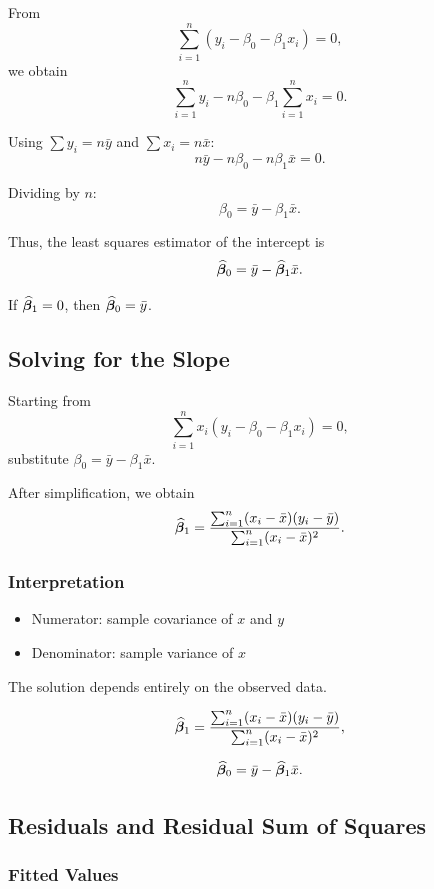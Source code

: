 From
\[
\sum_{i=1}^n (y_i - \beta_0 - \beta_1 x_i) = 0,
\]
we obtain
\[
\sum_{i=1}^n y_i - n\beta_0 - \beta_1 \sum_{i=1}^n x_i = 0.
\]

Using $\sum y_i = n\bar{y}$ and $\sum x_i = n\bar{x}$:
\[
n\bar{y} - n\beta_0 - n\beta_1 \bar{x} = 0.
\]

Dividing by $n$:
\[
\beta_0 = \bar{y} - \beta_1 \bar{x}.
\]

Thus, the least squares estimator of the intercept is
\[
\widehat{\boldsymbol{\beta}}_0 = \bar{y} - \widehat{\boldsymbol{\beta}}_1 \bar{x}.
\]

If $\widehat{\boldsymbol{\beta}}_1 = 0$, then $\widehat{\boldsymbol{\beta}}_0 = \bar{y}$.

\subsection{Solving for the Slope}

Starting from
\[
\sum_{i=1}^n x_i (y_i - \beta_0 - \beta_1 x_i) = 0,
\]
substitute $\beta_0 = \bar{y} - \beta_1 \bar{x}$.

After simplification, we obtain
\[
\widehat{\boldsymbol{\beta}}_1
=
\frac{\sum_{i=1}^n (x_i - \bar{x})(y_i - \bar{y})}
     {\sum_{i=1}^n (x_i - \bar{x})^2}.
\]

\subsubsection*{Interpretation}

\begin{itemize}
    \item Numerator: sample covariance of $x$ and $y$
    \item Denominator: sample variance of $x$
\end{itemize}

The solution depends entirely on the observed data.

\begin{keyresult}
\[
\widehat{\boldsymbol{\beta}}_1
=
\frac{\sum_{i=1}^n (x_i - \bar{x})(y_i - \bar{y})}
     {\sum_{i=1}^n (x_i - \bar{x})^2},
\]

\[
\widehat{\boldsymbol{\beta}}_0
=
\bar{y} - \widehat{\boldsymbol{\beta}}_1 \bar{x}.
\]
\end{keyresult}

\subsection{Residuals and Residual Sum of Squares}

\subsubsection*{Fitted Values}

